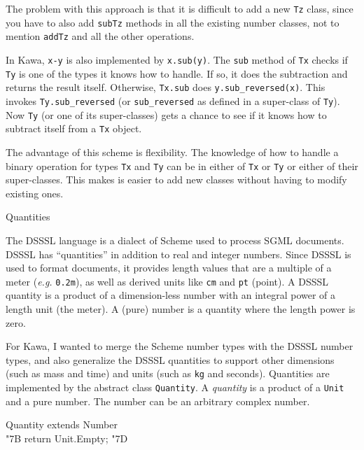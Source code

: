\documentclass[twocolumn]{article}
\makeatletter
\def\section{\@startsection {section}{1}{\z@}
   {14pt plus 2pt minus 2pt}{12pt plus 2pt minus 2pt} {\large\bf}}
\newcommand{\LBr}{\char"7B}
\newcommand{\RBr}{\char"7D}
\makeatother
\begin{document}
The problem with this approach is that it is difficult to add
a new {\tt Tz} class, since you have to also add {\tt subTz}
methods in all the existing number classes, not to mention
{\tt addTz} and all the other operations.

In Kawa, {\tt x-y} is also implemented by {\tt x.sub(y)}.
The {\tt sub} method of {\tt Tx} checks if {\tt Ty} is one
of the types it knows how to handle.  If so, it does the
subtraction and returns the result itself.
Otherwise, {\tt Tx.sub} does \verb|y.sub_reversed(x)|.  This invokes
\verb|Ty.sub_reversed| (or \verb|sub_reversed| as defined in
a super-class of {\tt Ty}).  Now {\tt Ty} (or one of its
super-classes) gets a chance to see if it knows how to
subtract itself from a {\tt Tx} object.

The advantage of this scheme is flexibility.  The knowledge of
how to handle a binary operation for types {\tt Tx} and {\tt Ty}
can be in either of {\tt Tx} or {\tt Ty} or either of their
super-classes.  This makes is easier to add new classes without
having to modify existing ones.

\section{Quantities}
\label{QuantitySection}

The DSSSL language \cite{DSSSL} is a dialect of Scheme used
to process SGML documents.  DSSSL has ``quantities'' in addition
to real and integer numbers.  Since DSSSL is used to format documents,
it provides length values that are a multiple of a meter
({\it e.g.} {\tt 0.2m}), as well as derived units like {\tt cm} and
{\tt pt} (point).
A DSSSL quantity is a product of a dimension-less number with an integral
power of a length unit (the meter).  A (pure) number is a quantity where
the length power is zero.

For Kawa, I wanted to merge the Scheme number types with the DSSSL
number types, and also generalize the DSSSL quantities to support
other dimensions (such as mass and time) and units (such as {\tt kg}
and seconds).  Quantities are implemented by the abstract class {\tt Quantity}.
A {\it quantity} is a product of a {\tt Unit} and a pure
number.  The number can be an arbitrary complex number.

\begin{Class}{Quantity}{ extends Number}
\\
{\LBr} return Unit.Empty; \RBr\\
\\
\end{Class}
\end{document}

